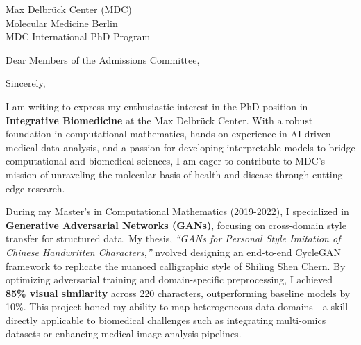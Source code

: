 \documentclass[11pt,a4paper, final]{moderncv}
\begin{document}
{Max Delbrück Center (MDC)\\
Molecular Medicine Berlin\\
MDC International PhD Program
}
\date{\today}
\opening{Dear Members of the Admissions Committee,}
\closing{Sincerely,}
\makelettertitle
\thispagestyle{empty}
\pagestyle{empty}
I am writing to express my enthusiastic interest in the PhD position 
in \textbf{Integrative Biomedicine} at the Max Delbrück Center. 
With a robust foundation in computational mathematics, 
hands-on experience in AI-driven medical data analysis, 
and a passion for developing interpretable models to bridge computational and biomedical sciences, 
I am eager to contribute to MDC's mission of unraveling the molecular basis of health and disease through cutting-edge research.

During my Master's in Computational Mathematics (2019-2022), 
I specialized in \textbf{Generative Adversarial Networks (GANs)}, 
focusing on cross-domain style transfer for structured data. 
My thesis, \emph{``GANs for Personal Style Imitation of Chinese Handwritten Characters,''} 
nvolved designing an end-to-end CycleGAN framework to replicate the nuanced calligraphic style of Shiling Shen Chern. 
By optimizing adversarial training and domain-specific preprocessing, 
I achieved \textbf{85\% visual similarity} across 220 characters, outperforming baseline models by 10\%. 
This project honed my ability to map heterogeneous data domains—a skill directly applicable to biomedical challenges 
such as integrating multi-omics datasets or enhancing medical image analysis pipelines.
\end{document}
